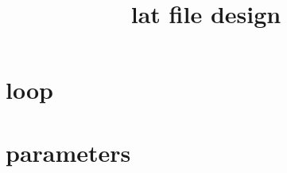 \documentclass[10pt,CCT]{ctexart}
\begin{document}
\title{lat file design}


\section{loop}


\section{parameters}
\end{document}
